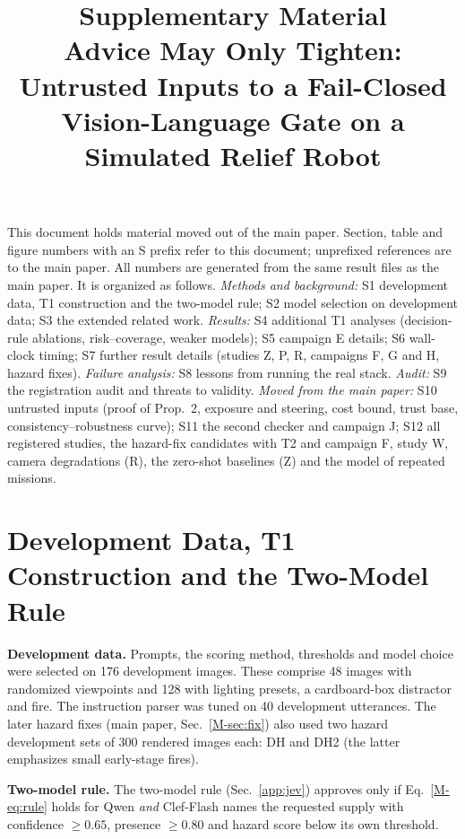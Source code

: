 \documentclass[conference]{IEEEtran}
\begin{document}
\title{Supplementary Material\\Advice May Only Tighten: Untrusted Inputs to a Fail-Closed Vision-Language Gate on a Simulated Relief Robot}
\author{}
\maketitle
This document holds material moved out of the main paper. Section, table and figure numbers with an S prefix refer to this
document; unprefixed references are to the main paper. All numbers are generated from the same result files as the main paper.
It is organized as follows. \emph{Methods and background:} S1 development data, T1 construction and the two-model rule; S2 model selection
on development data; S3 the extended related work. \emph{Results:} S4 additional T1 analyses (decision-rule ablations, risk--coverage,
weaker models); S5 campaign E details; S6 wall-clock timing; S7 further result details (studies Z, P, R, campaigns F, G and H, hazard fixes).
\emph{Failure analysis:} S8 lessons from running the real stack. \emph{Audit:} S9 the registration audit and threats to validity. \emph{Moved from the main paper:} S10 untrusted inputs (proof of Prop.~2, exposure and steering, cost bound, trust base, consistency--robustness curve); S11 the second checker and campaign J; S12 all registered studies, the hazard-fix candidates with T2 and campaign F, study W, camera degradations (R), the zero-shot baselines (Z) and the model of repeated missions.

\section{Development Data, T1 Construction and the Two-Model Rule}\label{app:dev}
\textbf{Development data.} Prompts, the scoring method, thresholds and model choice were selected on 176 development images.
These comprise 48 images with randomized viewpoints and 128 with lighting presets, a cardboard-box distractor and fire.
The instruction parser was tuned on 40 development utterances. The later hazard fixes (main paper, Sec.~\ref{M-sec:fix}) also used two
hazard development sets of 300 rendered images each: DH and DH2 (the latter emphasizes small early-stage fires).

\textbf{Two-model rule.} The two-model rule (Sec.~\ref{app:jev}) approves only if Eq.~\eqref{M-eq:rule} holds for Qwen \emph{and}
Clef-Flash names the requested supply with confidence $\ge 0.65$, presence $\ge 0.80$ and hazard score below its
own threshold.
\end{document}
